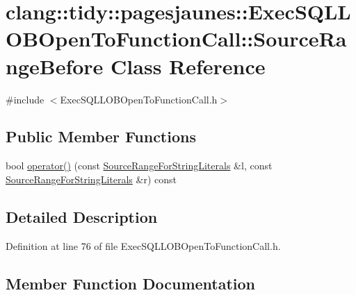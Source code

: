 \hypertarget{classclang_1_1tidy_1_1pagesjaunes_1_1_exec_s_q_l_l_o_b_open_to_function_call_1_1_source_range_before}{}\section{clang\+:\+:tidy\+:\+:pagesjaunes\+:\+:Exec\+S\+Q\+L\+L\+O\+B\+Open\+To\+Function\+Call\+:\+:Source\+Range\+Before Class Reference}
\label{classclang_1_1tidy_1_1pagesjaunes_1_1_exec_s_q_l_l_o_b_open_to_function_call_1_1_source_range_before}


{\ttfamily \#include $<$Exec\+S\+Q\+L\+L\+O\+B\+Open\+To\+Function\+Call.\+h$>$}

\subsection*{Public Member Functions}
\begin{DoxyCompactItemize}
\item 
bool \hyperlink{classclang_1_1tidy_1_1pagesjaunes_1_1_exec_s_q_l_l_o_b_open_to_function_call_1_1_source_range_before_a8c340debae1f3b679c540383579a95e3}{operator()} (const \hyperlink{classclang_1_1tidy_1_1pagesjaunes_1_1_exec_s_q_l_l_o_b_open_to_function_call_1_1_source_range_for_string_literals}{Source\+Range\+For\+String\+Literals} \&l, const \hyperlink{classclang_1_1tidy_1_1pagesjaunes_1_1_exec_s_q_l_l_o_b_open_to_function_call_1_1_source_range_for_string_literals}{Source\+Range\+For\+String\+Literals} \&r) const
\end{DoxyCompactItemize}


\subsection{Detailed Description}


Definition at line 76 of file Exec\+S\+Q\+L\+L\+O\+B\+Open\+To\+Function\+Call.\+h.



\subsection{Member Function Documentation}
\mbox{\label{classclang_1_1tidy_1_1pagesjaunes_1_1_exec_s_q_l_l_o_b_open_to_function_call_1_1_source_range_before_a8c340debae1f3b679c540383579a95e3}} 
